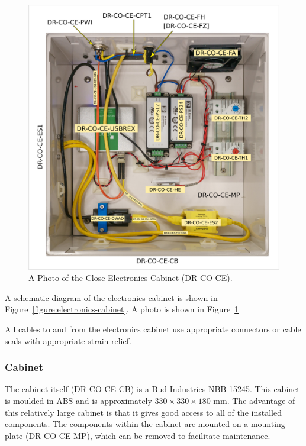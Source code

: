 \documentclass{article}
\begin{document}
\begin{figure}[tp]
\begin{center}
\includegraphics[width=0.9\linewidth]{figures/electronics-cabinet-photo.jpg}
\end{center}
\caption{A Photo of the Close Electronics Cabinet (DR-CO-CE).}
\label{figure:electronics-cabinet-photo}
\end{figure}

A schematic diagram of the electronics cabinet is shown in Figure~\ref{figure:electronics-cabinet}. A photo is shown in Figure~\ref{figure:electronics-cabinet-photo}

All cables to and from the electronics cabinet use appropriate connectors or cable seals with appropriate strain relief.

\subsubsection{Cabinet}

The cabinet itself (DR-CO-CE-CB) is a Bud Industries NBB-15245. This cabinet is moulded in ABS and is approximately $330 \times 330 \times 180$ mm. The advantage of this relatively large cabinet is that it gives good access to all of the installed components. The components within the cabinet are mounted on a mounting plate (DR-CO-CE-MP), which can be removed to facilitate maintenance.
\end{document}
